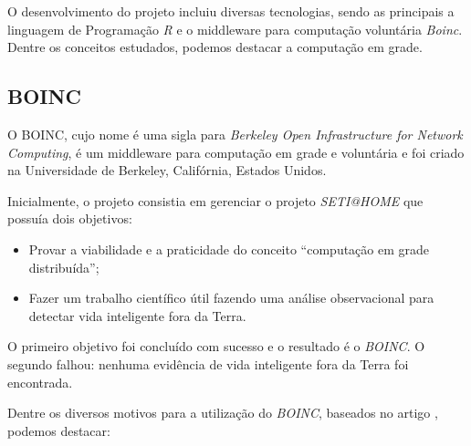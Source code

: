 O desenvolvimento do projeto incluiu diversas tecnologias, sendo as principais a linguagem de Programação \emph{R} e o middleware
para computação voluntária \emph{Boinc}. Dentre os conceitos estudados, podemos destacar a computação em grade.  

\subsection{BOINC}

O BOINC, cujo nome é uma sigla para \textit{Berkeley Open Infrastructure for Network Computing}, é um middleware 
para computação em grade e voluntária e foi criado na Universidade de Berkeley, Califórnia, Estados Unidos.

Inicialmente, o projeto consistia em gerenciar o projeto \textit{SETI@HOME} que possuía dois objetivos:

\begin{itemize}
	\item Provar a viabilidade e a praticidade do conceito ``computação em grade distribuída'';
	\item Fazer um trabalho científico útil fazendo uma análise observacional para detectar vida inteligente fora da Terra.
\end{itemize}

O primeiro objetivo foi concluído com sucesso e o resultado é o \textit{BOINC}. O segundo falhou: nenhuma evidência de 
vida inteligente fora da Terra foi encontrada. 

Dentre os diversos motivos para a utilização do \emph{BOINC}, baseados no artigo \cite{boinc}, podemos destacar:

